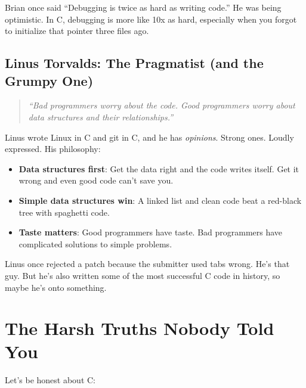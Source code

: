 \documentclass[10pt,openany]{book}
\begin{document}
Brian once said ``Debugging is twice as hard as writing code.'' He was being optimistic. In C, debugging is more like 10x as hard, especially when you forgot to initialize that pointer three files ago.

\subsection*{Linus Torvalds: The Pragmatist (and the Grumpy One)}

\begin{quote}
\textit{``Bad programmers worry about the code. Good programmers worry about data structures and their relationships.''}
\end{quote}

Linus wrote Linux in C and git in C, and he has \textit{opinions}. Strong ones. Loudly expressed. His philosophy:

\begin{itemize}
    \item \textbf{Data structures first}: Get the data right and the code writes itself. Get it wrong and even good code can't save you.
    \item \textbf{Simple data structures win}: A linked list and clean code beat a red-black tree with spaghetti code.
    \item \textbf{Taste matters}: Good programmers have taste. Bad programmers have complicated solutions to simple problems.
\end{itemize}

Linus once rejected a patch because the submitter used tabs wrong. He's that guy. But he's also written some of the most successful C code in history, so maybe he's onto something.

\section*{The Harsh Truths Nobody Told You}

Let's be honest about C:
\end{document}

